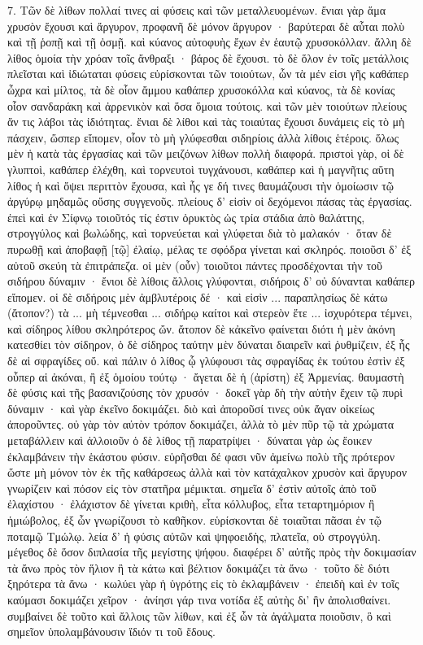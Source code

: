 \documentclass[a4paper, 11pt, oneside, polutonikogreek, german]{article}
\begin{document}
7. Τῶν δὲ λίθων πολλαί τινες αἱ φύσεις καὶ τῶν μεταλλευομένων. ἔνιαι γὰρ ἅμα χρυσὸν ἔχουσι καὶ ἄργυρον, προφανῆ δὲ μόνον ἄργυρον · βαρύτεραι δὲ αὗται πολὺ καὶ τῇ ῥοπῇ καὶ τῇ ὀσμῇ. καὶ κύανος αὐτοφυὴς ἔχων ἐν ἑαυτῷ χρυσοκόλλαν. ἄλλη δὲ λίθος ὁμοία τὴν χρόαν τοῖς ἄνθραξι · βάρος δὲ ἔχουσι. τὸ δὲ ὅλον ἐν τοῖς μετάλλοις πλεῖσται καὶ ἰδιώταται φύσεις εὑρίσκονται τῶν τοιούτων, ὧν τὰ μέν εἰσι γῆς καθάπερ ὦχρα καὶ μίλτος, τὰ δὲ οἷον ἄμμου καθάπερ χρυσοκόλλα καὶ κύανος, τὰ δὲ κονίας οἷον σανδαράκη καὶ ἀρρενικὸν καὶ ὅσα ὅμοια τούτοις. καὶ τῶν μὲν τοιούτων πλείους ἄν τις λάβοι τὰς ἰδιότητας. ἔνιαι δὲ λίθοι καὶ τὰς τοιαύτας ἔχουσι δυνάμεις εἰς τὸ μὴ πάσχειν, ὥσπερ εἴπομεν, οἷον τὸ μὴ γλύφεσθαι σιδηρίοις ἀλλὰ λίθοις ἑτέροις. ὅλως μὲν ἡ κατὰ τὰς ἐργασίας καὶ τῶν μειζόνων λίθων πολλὴ διαφορά. πριστοὶ γὰρ, οἱ δὲ γλυπτοὶ, καθάπερ ἐλέχθη, καὶ τορνευτοὶ τυγχάνουσι, καθάπερ καὶ ἡ μαγνῆτις αὕτη λίθος ἡ καὶ ὄψει περιττὸν ἔχουσα, καὶ ἧς γε δή τινες θαυμάζουσι τὴν ὁμοίωσιν τῷ ἀργύρῳ μηδαμῶς οὔσης συγγενοῦς. πλείους δ' εἰσὶν οἱ δεχόμενοι πάσας τὰς ἐργασίας. ἐπεὶ καὶ ἐν Σίφνῳ τοιοῦτός τίς ἐστιν ὀρυκτὸς ὡς τρία στάδια ἀπὸ θαλάττης, στρογγύλος καὶ βωλώδης, καὶ τορνεύεται καὶ γλύφεται διὰ τὸ μαλακόν · ὅταν δὲ πυρωθῇ καὶ ἀποβαφῇ [τῷ] ἐλαίῳ, μέλας τε σφόδρα γίνεται καὶ σκληρός. ποιοῦσι δ' ἐξ αὐτοῦ σκεύη τὰ ἐπιτράπεζα. οἱ μὲν (οὖν) τοιοῦτοι πάντες προσδέχονται τὴν τοῦ σιδήρου δύναμιν · ἔνιοι δὲ λίθοις ἄλλοις γλύφονται, σιδήροις δ' οὐ δύνανται καθάπερ εἴπομεν. οἱ δὲ σιδήροις μὲν ἀμβλυτέροις δέ · καὶ εἰσὶν ... παραπλησίως δὲ κάτω (ἄτοπον?) τὰ ... μὴ τέμνεσθαι ... σιδήρῳ καίτοι καὶ στερεὸν ἕτε ... ἰσχυρότερα τέμνει, καὶ σίδηρος λίθου σκληρότερος ὤν. ἄτοπον δὲ κἀκεῖνο φαίνεται διότι ἡ μὲν ἀκόνη κατεσθίει τὸν σίδηρον, ὁ δὲ σίδηρος ταύτην μὲν δύναται διαιρεῖν καὶ ῥυθμίζειν, ἐξ ἧς δὲ αἱ σφραγίδες οὔ. καὶ πάλιν ὁ λίθος ᾧ γλύφουσι τὰς σφραγίδας ἐκ τούτου ἐστὶν ἐξ οὗπερ αἱ ἀκόναι, ἢ ἐξ ὁμοίου τούτῳ · ἄγεται δὲ ἡ (ἀρίστη) ἐξ Ἀρμενίας. θαυμαστὴ δὲ φύσις καὶ τῆς βασανιζούσης τὸν χρυσόν · δοκεῖ γὰρ δὴ τὴν αὐτὴν ἔχειν τῷ πυρὶ δύναμιν · καὶ γὰρ ἐκεῖνο δοκιμάζει. διὸ καὶ ἀποροῦσί τινες οὐκ ἄγαν οἰκείως ἀποροῦντες. οὐ γὰρ τὸν αὐτὸν τρόπον δοκιμάζει, ἀλλὰ τὸ μὲν πῦρ τῷ τὰ χρώματα μεταβάλλειν καὶ ἀλλοιοῦν ὁ δὲ λίθος τῇ παρατρίψει · δύναται γὰρ ὡς ἔοικεν ἐκλαμβάνειν τὴν ἑκάστου φύσιν. εὑρῆσθαι δέ φασι νῦν ἀμείνω πολὺ τῆς πρότερον ὥστε μὴ μόνον τὸν ἐκ τῆς καθάρσεως ἀλλὰ καὶ τὸν κατάχαλκον χρυσὸν καὶ ἄργυρον γνωρίζειν καὶ πόσον εἰς τὸν στατῆρα μέμικται. σημεῖα δ' ἐστὶν αὐτοῖς ἀπὸ τοῦ ἐλαχίστου · ἐλάχιστον δὲ γίνεται κριθὴ, εἶτα κόλλυβος, εἶτα τεταρτημόριον ἢ ἡμιώβολος, ἐξ ὧν γνωρίζουσι τὸ καθῆκον. εὑρίσκονται δὲ τοιαῦται πᾶσαι ἐν τῷ ποταμῷ Τμώλῳ. λεία δ' ἡ φύσις αὐτῶν καὶ ψηφοειδὴς, πλατεῖα, οὐ στρογγύλη. μέγεθος δὲ ὅσον διπλασία τῆς μεγίστης ψήφου. διαφέρει δ' αὐτῆς πρὸς τὴν δοκιμασίαν τὰ ἄνω πρὸς τὸν ἥλιον ἢ τὰ κάτω καὶ βέλτιον δοκιμάζει τὰ ἄνω · τοῦτο δὲ διότι ξηρότερα τὰ ἄνω · κωλύει γὰρ ἡ ὑγρότης εἰς τὸ ἐκλαμβάνειν · ἐπειδὴ καὶ ἐν τοῖς καύμασι δοκιμάζει χεῖρον · ἀνίησι γάρ τινα νοτίδα ἐξ αὐτὴς δι' ἣν ἀπολισθαίνει. συμβαίνει δὲ τοῦτο καὶ ἄλλοις τῶν λίθων, καὶ ἐξ ὧν τὰ ἀγάλματα ποιοῦσιν, ὃ καὶ σημεῖον ὑπολαμβάνουσιν ἴδιόν τι τοῦ ἕδους.
\end{document}
